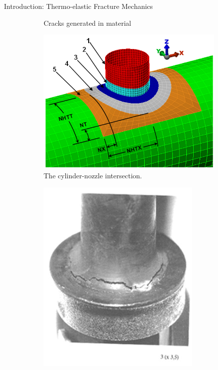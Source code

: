 \documentclass{beamer}
\begin{document}
\begin{frame}[t,fragile]{Introduction: Thermo-elastic Fracture Mechanics}
\begin{itemize}
\begin{figure}[H]
\begin{subfigure}{0.45\textwidth}
 \vspace{-.2cm}
 \caption{\tiny Cracks generated in material}
 \end{subfigure}
       \vspace{-.3cm}
      \begin{subfigure}{0.45\textwidth}
    \centering
    \includegraphics[scale=.1]{cyl.png}
 \vspace{-.2cm}
 \caption{\tiny{The cylinder-nozzle intersection.}}
 \label{cyl}
 \end{subfigure}
\begin{subfigure}{0.45\textwidth}
    \centering
    \includegraphics[scale=.1]{fail.jpg}
 \vspace{-.2cm}

\end{subfigure}
\end{figure}
\end{itemize}
\end{frame}
\end{document}
